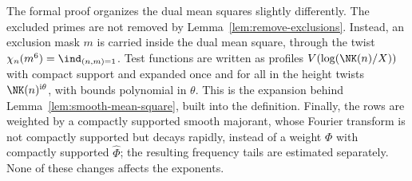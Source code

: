 \begin{remark}\label{rem:formal-dual}
The formal proof organizes the dual mean squares slightly differently. The excluded primes are
not removed by Lemma~\ref{lem:remove-exclusions}. Instead, an exclusion mask $m$ is carried
inside the dual mean square, through the twist $\chi_n(m^6)=\ind_{(n,m)=1}$. Test functions are
written as profiles $V(\log(\NK(n)/X))$ with compact support and expanded once and for all in
the height twists $\NK(n)^{\mathrm i\theta}$, with bounds polynomial in $\theta$. This is the
expansion behind Lemma~\ref{lem:smooth-mean-square}, built into the definition. Finally, the
rows are weighted by a compactly supported smooth majorant, whose Fourier transform is not
compactly supported but decays rapidly, instead of a weight $\Phi$ with compactly supported
$\widehat\Phi$; the resulting frequency tails are estimated separately. None of these changes
affects the exponents.
\end{remark}
